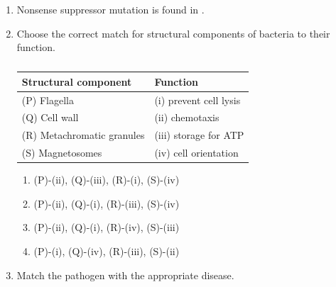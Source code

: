 \documentclass[journal,12pt,onecolumn]{IEEEtran}
\theoremstyle{remark}
\begin{document}
\begin{enumerate}
    \item Nonsense suppressor mutation is found in \underline{\hspace{2cm}}.

    \hfill{}

    \begin{enumerate}
    \end{enumerate}

    \item Choose the correct match for structural components of bacteria to their function.

    \hfill{}

    \begin{table}[h!]
    \centering
    \caption*{}
    \label{tab:q75}
    \begin{tabular}{ll}
    \hline
    \textbf{Structural component} & \textbf{Function} \\
    \hline
    (P) Flagella & (i) prevent cell lysis \\
    (Q) Cell wall & (ii) chemotaxis \\
    (R) Metachromatic granules & (iii) storage for ATP \\
    (S) Magnetosomes & (iv) cell orientation \\
    \hline
    \end{tabular}
    \end{table}

    \begin{enumerate}
        \item (P)-(ii), (Q)-(iii), (R)-(i), (S)-(iv)
        \item (P)-(ii), (Q)-(i), (R)-(iii), (S)-(iv)
        \item (P)-(ii), (Q)-(i), (R)-(iv), (S)-(iii)
        \item (P)-(i), (Q)-(iv), (R)-(iii), (S)-(ii)
    \end{enumerate}

    \item Match the pathogen with the appropriate disease.

    \hfill{}


\end{enumerate}
\end{document}
